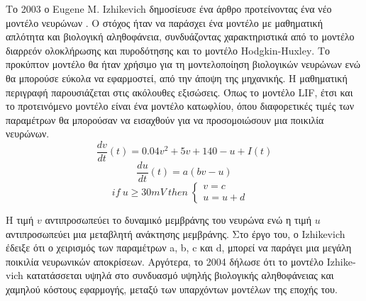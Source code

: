 \documentclass[12pt]{report}
\begin{document}
Το 2003 ο \textlatin{Eugene M. Izhikevich} δημοσίευσε ένα άρθρο προτείνοντας ένα νέο μοντέλο νευρώνων \cite{Izhikevich2003}. Ο στόχος ήταν να παράσχει ένα μοντέλο με μαθηματική απλότητα και βιολογική αληθοφάνεια, συνδυάζοντας χαρακτηριστικά από το μοντέλο διαρρεόν ολοκλήρωσης και πυροδότησης και το μοντέλο \textlatin{Hodgkin-Huxley}. Το προκύπτον μοντέλο θα ήταν χρήσιμο για τη μοντελοποίηση βιολογικών νευρώνων ενώ θα μπορούσε εύκολα να εφαρμοστεί, από την άποψη της μηχανικής. Η μαθηματική περιγραφή παρουσιάζεται στις ακόλουθες εξισώσεις. Όπως το μοντέλο \textlatin{LIF}, έτσι και το προτεινόμενο μοντέλο είναι ένα μοντέλο κατωφλίου, όπου διαφορετικές τιμές των παραμέτρων θα μπορούσαν να εισαχθούν για να προσομοιώσουν μια ποικιλία νευρώνων.
\begin{equation}
    \frac{dv}{dt}(t) = 0.04v^2+5v+140-u+I(t)
\end{equation}
\begin{equation}
\frac{du}{dt}(t) = a(bv-u)
\end{equation}
\begin{equation}
if \:u\geq30mV \: then \: \left\{
\begin{array}{ll}
     v = c &  \\
     u = u+d & 
\end{array}
\right.
\end{equation}

Η τιμή \(v\) αντιπροσωπεύει το δυναμικό μεμβράνης του νευρώνα ενώ η τιμή \(u\) αντιπροσωπεύει μια μεταβλητή ανάκτησης μεμβράνης. Στο έργο του, ο \textlatin{Izhikevich} έδειξε ότι ο χειρισμός των παραμέτρων \textlatin{a, b, c} και \textlatin{d}, μπορεί να παράγει μια μεγάλη ποικιλία νευρωνικών αποκρίσεων. Αργότερα, το 2004 δήλωσε \cite{Izhikevich2004} ότι το μοντέλο \textlatin{Izhikevich} κατατάσσεται υψηλά στο συνδυασμό υψηλής βιολογικής αληθοφάνειας και χαμηλού κόστους εφαρμογής, μεταξύ των υπαρχόντων μοντέλων της εποχής του.
\end{document}
